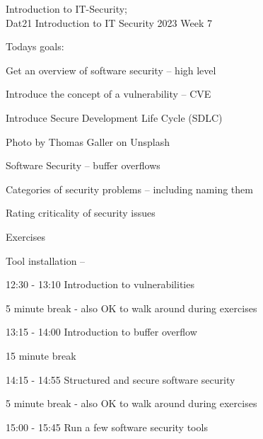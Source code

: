 \documentclass[Screen16to9,17pt]{foils}
\begin{document}
{Introduction to IT-Security;\\Dat21 Introduction to IT Security 2023 Week 7}

\hlkprofiluk



Todays goals:
\begin{list2}
\item Get an overview of software security -- high level
\item Introduce the concept of a vulnerability -- CVE
\item Introduce Secure Development Life Cycle (SDLC)
\end{list2}

\hfill {\small Photo by Thomas Galler on Unsplash}


\begin{list2}
\item Software Security -- buffer overflows
\item Categories of security problems -- including naming them
\item Rating criticality of security issues
\end{list2}

Exercises
\begin{list2}
\item Tool installation --
\end{list2}




\begin{list1}
\item 12:30 - 13:10 Introduction to vulnerabilities
\item 5 minute break - also OK to walk around during exercises
\item 13:15 - 14:00 Introduction to buffer overflow
\item 15 minute break
\item 14:15 - 14:55 Structured and secure software security
\item 5 minute break - also OK to walk around during exercises
\item 15:00 - 15:45 Run a few software security tools
\end{list1}
\end{document}
